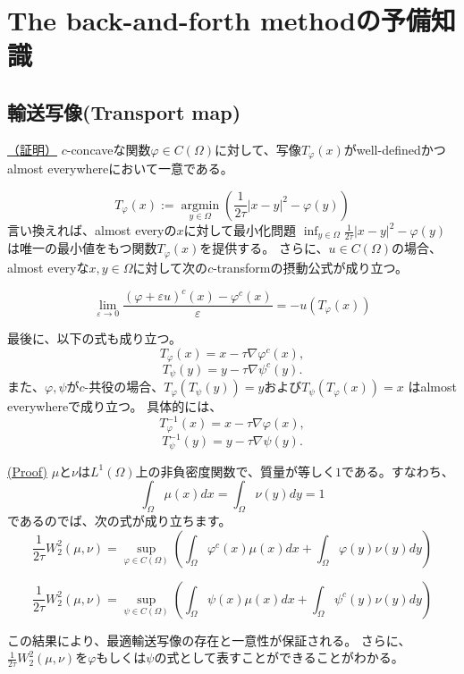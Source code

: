 \chapter{The back-and-forth methodの予備知識}
\label{ch:baf_background}

\section{輸送写像(Transport map)}
\label{輸送写像(Transport map)}
\begin{prop}
    \label{prop:transport map}
    \hyperlink{proof:prop:transport map}{（証明）}
    $c$-concaveな関数$\varphi \in C(\Omega)$に対して、写像$T_\varphi(x)$がwell-definedかつalmost everywhereにおいて一意である。
    
    \begin{equation}
        T_\varphi(x):= \underset{y \in \Omega} {\operatorname{argmin}}\left( \frac{1}{2 \tau} |x - y|^2 - \varphi(y) \right) 
    \end{equation}
    言い換えれば、almost everyの$x$に対して最小化問題 $\inf_{y \in \Omega} \frac{1}{2 \tau} |x - y|^2 - \varphi(y)$ は唯一の最小値をもつ関数$T_\varphi(x)$を提供する。
    さらに、$u \in C(\Omega)$の場合、almost everyな$x, y \in \Omega$に対して次の$c$-transformの摂動公式が成り立つ。
    
    \begin{equation}
        \lim_{\varepsilon \to 0} \frac{(\varphi + \varepsilon u)^c(x) - \varphi^c(x)}{\varepsilon} = - u(T_\varphi(x))
    \end{equation}
    
    最後に、以下の式も成り立つ。
    \[
        T_\varphi(x) = x - \tau \nabla \varphi^c(x),
    \]
    \[
        T_\psi(y) = y - \tau \nabla \psi^c(y).
    \]
    また、$\varphi, \psi$が$c$-共役の場合、$T_\varphi(T_\psi(y)) = y$および$T_\psi(T_\varphi(x)) = x$ はalmost everywhereで成り立つ。
    具体的には、
    \[
        T_\varphi^{-1}(x) = x - \tau \nabla \varphi(x),
    \] 
    \[
        T_\psi^{-1}(y) = y - \tau \nabla \psi(y) .
    \] 
\end{prop}

\begin{prop}
    \label{prop:wasserstein}
    \hyperlink{proof:prop:wasserstein}{(Proof)}
    $\mu$と$\nu$は$L^1(\Omega)$上の非負密度関数で、質量が等しく$1$である。すなわち、
    \[
        \int_{\Omega} \mu(x)dx = \int_{\Omega} \nu(y)dy = 1
    \]
    であるのでば、次の式が成り立ちます。
    \[
        \frac{1}{2\tau}W_2^2(\mu, \nu) = \sup_{\varphi \in C(\Omega)} \left( \int_{\Omega} \varphi^c(x) \mu(x)dx + \int_{\Omega} \varphi(y) \nu(y)dy \right) 
    \]

    \[
        \frac{1}{2\tau}W_2^2(\mu, \nu) = \sup_{\psi \in C(\Omega)} \left( \int_{\Omega} \psi(x) \mu(x)dx + \int_{\Omega} \psi^c (y) \nu(y)dy \right) 
    \]
\end{prop}
この結果により、最適輸送写像の存在と一意性が保証される。
さらに、$\frac{1}{2\tau}W_2^2(\mu, \nu)$を$\varphi$もしくは$\psi$の式として表すことができることがわかる。

